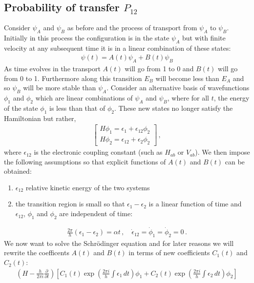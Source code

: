 \subsection{Probability of transfer $P_{12}$}
Consider $\psi_A$ and $\psi_B$ as before and the process of transport from $\psi_A$ to $\psi_B$. Initially in this process the configuration is in the state $\psi_A$ but with finite velocity at any subsequent time it is in a linear combination of these states:
\begin{align}
    \psi(t) = A(t) \psi_A + B(t) \psi_B
\end{align}
As time evolves in the transport $A(t)$ will go from 1 to 0 and $B(t)$ will go from 0 to 1. Furthermore along this transition $E_B$ will become less than $E_A$ and so $\psi_B$ will be more stable than $\psi_A$. Consider an alternative basis of wavefunctions $\phi_1$ and $\phi_2$ which are linear combinations of $\psi_A$ and $\psi_B$, where for all $t$, the energy of the state $\phi_1$ is less than that of $\phi_2$. These new states no longer satisfy the Hamiltonian but rather,
\begin{align}
    \begin{bmatrix}
        H\phi_1 = \epsilon_1 + \epsilon_{12}\phi_2 \\
        H\phi_2 = \epsilon_{12} + \epsilon_2\phi_2
    \end{bmatrix} \, ,
\end{align}
where $\epsilon_{12}$ is the electronic coupling constant (such as $H_{ab}$ or $V_{ab}$). We then impose the following assumptions so that explicit functions of $A(t)$ and $B(t)$ can be obtained:
\begin{enumerate}
    \item $\epsilon_{12}$  relative kinetic energy of the two systems
    \item the transition region is small so that $\epsilon_{1} - \epsilon_{2}$ is a linear function of time and $\epsilon_{12}$, $\phi_{1}$ and $\phi_{2}$ are independent of time:
\end{enumerate}
\begin{align}
    \frac{2\pi}{h} (\epsilon_1 - \epsilon_2)
    = \alpha t \, , \quad \dot{\epsilon}_{12}
    = \dot{\phi}_1 = \dot{\phi}_2 = 0 \, .
    \label{eq:ansatz}
\end{align}
We now want to solve the Schr{\"o}dinger equation and for later reasons we will rewrite the coefficents $A(t)$ and $B(t)$ in terms of new coefficients $C_1(t)$ and $C_2(t)$:
\begin{align}
    \left( H - \frac{h}{2\pi i} \frac{\partial}{\partial t} \right)
    \left[
        C_1(t) \exp \left( \frac{2\pi i}{h} \int \epsilon_1 \, dt \right) \phi_1
        + C_2(t) \exp \left( \frac{2\pi i}{h} \int \epsilon_2 \, dt \right) \phi_2
    \right]
\end{align}
